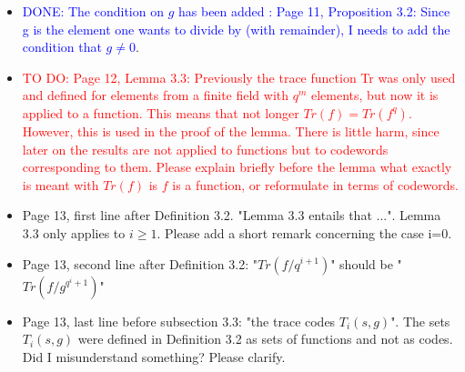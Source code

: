 \documentclass[12pt,a4paper]{amsart}
\newcommand\TODO[1]{\textcolor{red}{TO DO: #1}}
\newcommand\DONE[1]{\textcolor{blue}{DONE: #1}}
\begin{document}
\begin{itemize}
\item \DONE{The condition on $g$ has been added : Page 11, Proposition 3.2: Since g is the element one wants to divide by (with remainder), I needs to add the condition that $g \neq 0$}.

\item \TODO{Page 12, Lemma 3.3: Previously the trace function Tr was only used and defined for elements from a finite field with $q^m$ elements, but now it is applied to a function. This means that not longer $Tr(f)=Tr(f^q)$. However, this is used in the proof of the lemma. There is little harm, since later on the results are not applied to functions but to codewords corresponding to them. Please explain briefly before the lemma what exactly is meant with $Tr(f)$ is $f$ is a function, or reformulate in terms of codewords.}

\item Page 13, first line after Definition 3.2. "Lemma 3.3 entails that ...". Lemma 3.3 only applies to $i \ge 1$. Please add a short remark concerning the case i=0. 

\item Page 13, second line after Definition 3.2: "$Tr(f/q^{i+1})$" should be "$Tr(f/g^{q^i+1})$"

\item Page 13, last line before subsection 3.3: "the trace codes $T_i(s,g)$". The sets $T_i(s,g)$ were defined in Definition 3.2 as sets of functions and not as codes. Did I misunderstand something? Please clarify.
\end{itemize}
\end{document}
